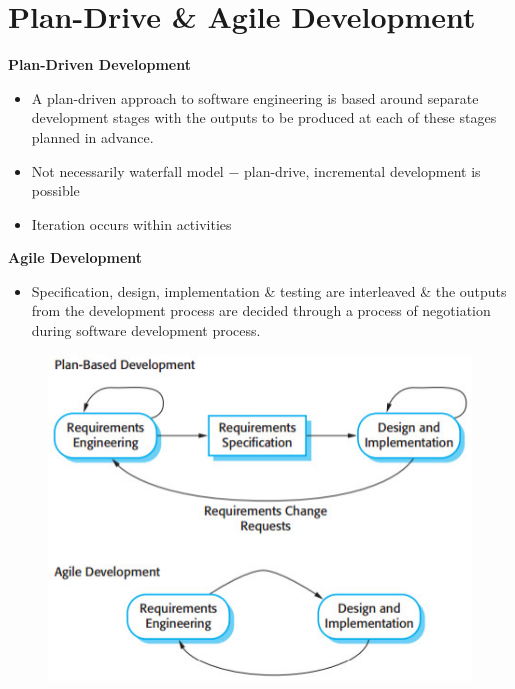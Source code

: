 \documentclass{report}
\begin{document}
\section{Plan-Drive \& Agile Development}
\vspace{-1em}
\begin{multicols}{2}
\noindent\textbf{Plan-Driven Development}
\begin{itemize}
  \item A plan-driven approach to software engineering is based around separate development stages with the outputs to be produced at each of these stages planned in advance.
  \item Not necessarily waterfall model $-$ plan-drive, incremental development is possible
  \item Iteration occurs within activities
\end{itemize}  
\textbf{Agile Development}
\begin{itemize}
  \item Specification, design, implementation \& testing are interleaved \& the outputs from the development process are decided through a process of negotiation during software development process.
\end{itemize}
\begin{figure}[H]
\centering
\includegraphics[scale=.5,trim=1cm 1cm 1cm 1cm]{assets/CEN4010_Agile_Plan_Driven.jpg}
\end{figure}
\end{multicols}
\end{document}
